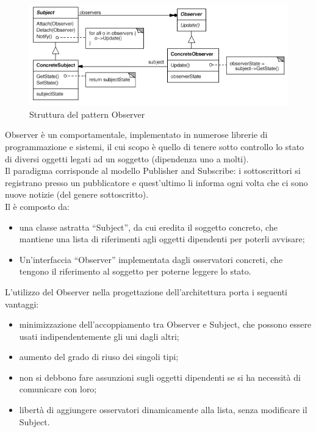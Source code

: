 	 \label{app:observer}
	\begin{figure}[H]\centering
    \includegraphics[scale=0.7]{SpecificaTecnica/Pics/Observer}
    \caption{Struttura del pattern Observer}
	\end{figure}
	Observer è un  comportamentale, implementato in numerose librerie di programmazione e sistemi, il cui scopo è quello di tenere sotto controllo lo stato di diversi oggetti legati ad un soggetto (dipendenza uno a molti). \\
	Il paradigma corrisponde al modello Publisher and Subscribe: i sottoscrittori si registrano presso un pubblicatore e quest’ultimo li informa ogni volta che ci sono nuove notizie (del genere sottoscritto).\\
	Il  è composto da:
	\begin{itemize}
		\item una classe astratta “Subject”, da cui eredita il soggetto concreto, che mantiene una lista di riferimenti agli oggetti dipendenti per poterli avvisare;
		\item Un’interfaccia “Observer” implementata dagli osservatori concreti, che tengono il riferimento al soggetto per poterne leggere lo stato.
	\end{itemize}
		L’utilizzo del  Observer nella progettazione dell’architettura porta i seguenti vantaggi:
		\begin{itemize}
			\item minimizzazione dell’accoppiamento tra Observer e Subject, che possono essere usati indipendentemente gli uni dagli altri;
			\item aumento del grado di riuso dei singoli tipi;
			\item non si debbono fare assunzioni sugli oggetti dipendenti se si ha necessità di comunicare con loro;
			\item libertà di aggiungere osservatori dinamicamente alla lista, senza modificare il Subject.
		\end{itemize}
